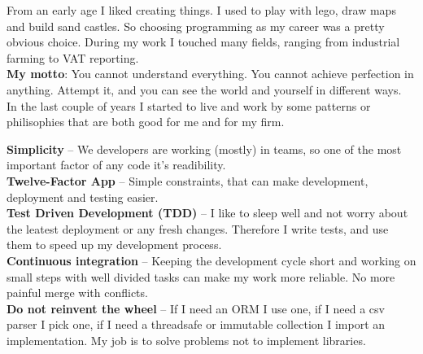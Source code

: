 \documentclass[9pt]{developercv} %
\begin{document}


\begin{minipage}[t]{0.48\textwidth} %
	\vspace{-\baselineskip} %
	From an early age I liked creating things. I used to play with lego, draw maps and build sand castles.
	So choosing programming as my career was a pretty obvious choice.
	During my work I touched many fields, ranging from industrial farming to VAT reporting. \\

	\textbf{My motto}:
	You cannot understand everything.
	You cannot achieve perfection in anything.
	Attempt it, and you can see the world and yourself in different ways. \\

	In the last couple of years I started to live and work by some patterns or philisophies that are both good for me and for my firm. \\
\end{minipage}
\hfill %
\begin{minipage}[t]{0.5\textwidth} %
	\vspace{-\baselineskip} %

	\textbf{Simplicity} -- We developers are working (mostly) in teams, so one of the most important factor of any code it's readibility. \\
	\textbf{Twelve-Factor App} -- Simple constraints, that can make development, deployment and testing easier. \\
	\textbf{Test Driven Development (TDD)} -- I like to sleep well and not worry about the leatest deployment or any fresh changes.
	Therefore I write tests, and use them to speed up my development process. \\
	\textbf{Continuous integration} -- Keeping the development cycle short and working on small steps with well divided tasks can make my work more reliable. No more painful merge with conflicts.\\
	\textbf{Do not reinvent the wheel} -- If I need an ORM I use one,
	if I need a csv parser I pick one,
	if I need a threadsafe or immutable collection I import an implementation.
	My job is to solve problems not to implement libraries.\\
\end{minipage}
\end{document}
